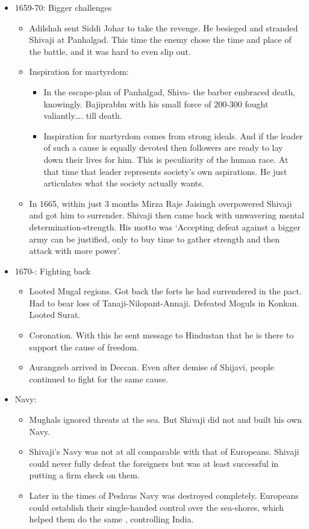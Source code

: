 \begin{itemize}[noitemsep,nolistsep]
\item 1659-70: Bigger challenges
	\begin{itemize}[noitemsep,nolistsep]
	\item Adilshah sent Siddi Johar to take the revenge. He besieged and stranded Shivaji at Panhalgad. This time the enemy chose the time and place of the battle, and it was hard to even slip out.
	\item Inspiration for martyrdom:
		\begin{itemize}[noitemsep,nolistsep]
		\item In the escape-plan of Panhalgad, Shiva- the barber embraced death, knowingly.  Bajiprabhu with his small force of 200-300 fought valiantly…. till death.
		\item Inspiration for martyrdom comes from strong ideals. And if the leader of such a cause is equally devoted then followers are ready to lay down their lives for him. This is peculiarity of the human race. At that time that leader represents society’s own aspirations. He just articulates what the society actually wants.
		\end{itemize}
	\item In 1665, within just 3 months Mirza Raje Jaisingh overpowered Shivaji and got him to surrender. Shivaji then came back with unwavering mental determination-strength. His motto was ‘Accepting defeat against a bigger army can be justified, only to buy time to gather strength and then attack with more power’.
	\end{itemize}

\item 1670-:  Fighting back
	\begin{itemize}[noitemsep,nolistsep]
	\item Looted Mugal regions. Got back the forts he had surrendered in the pact. Had to bear loss of Tanaji-Nilopant-Annaji. Defeated Moguls in Konkan. Looted Surat.
	\item Coronation. With this he sent message to Hindustan that he is there to support the cause of freedom.
	\item Aurangzeb arrived in Deccan. Even after demise of Shijavi, people continued to fight for the same cause.
	\end{itemize}

\item Navy:
	\begin{itemize}[noitemsep,nolistsep]
	\item Mughals ignored threats at the sea. But Shivaji did not and built his own Navy.
	\item Shivaji’s Navy was not at all comparable with that of Europeans. Shivaji could never fully defeat the foreigners but was at least successful in putting a firm check on them.
	\item Later in the times of Peshvas Navy was destroyed completely. Europeans could establish their single-handed control over the sea-shores, which helped them do the same , controlling India.
	\end{itemize}


\end{itemize}
